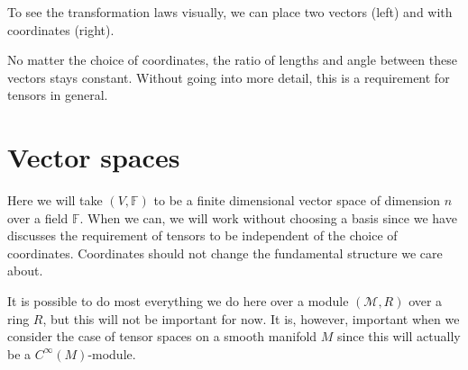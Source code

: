 \documentclass[12pt]{article}
\newcommand{\field}{\mathbb{F}}
\theoremstyle{definition}
\begin{document}
To see the transformation laws visually, we can place two vectors (left) and with coordinates (right).
        \begin{center}
        \hspace*{3cm}
        \end{center}
No matter the choice of coordinates, the ratio of lengths and angle between these vectors stays constant. Without going into more detail, this is a requirement for tensors in general.  

\section{Vector spaces}
Here we will take $(V,\field)$ to be a finite dimensional vector space of dimension $n$ over a field $\field$. When we can, we will work without choosing a basis since we have discusses the requirement of tensors to be independent of the choice of coordinates. Coordinates should not change the fundamental structure we care about.

It is possible to do most everything we do here over a module $(\mathcal{M},R)$ over a ring $R$, but this will not be important for now.  It is, however, important when we consider the case of tensor spaces on a smooth manifold $M$ since this will actually be a $C^\infty(M)$-module.
\end{document}
